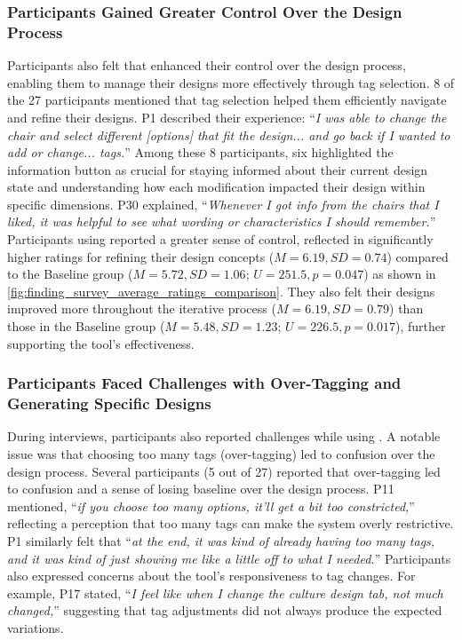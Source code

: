 \subsubsection{\toolname{} Participants Gained Greater Control Over the Design Process}
Participants also felt that \toolname{} enhanced their control over the design process, enabling them to manage their designs more effectively through tag selection. 8 of the 27 participants mentioned that tag selection helped them efficiently navigate and refine their designs. P1 described their experience: ``\textit{I was able to change the chair and select different [options] that fit the design... and go back if I wanted to add or change... tags.}'' Among these 8 participants, six highlighted the information button as crucial for staying informed about their current design state and understanding how each modification impacted their design within specific dimensions. P30 explained, ``\textit{Whenever I got info from the chairs that I liked, it was helpful to see what wording or characteristics I should remember.}'' Participants using \toolname{} reported a greater sense of control, reflected in significantly higher ratings for refining their design concepts ($M = 6.19, SD = 0.74$) compared to the Baseline group ($M = 5.72, SD = 1.06$; $U = 251.5, p = 0.047$) as shown in \autoref{fig:finding_survey_average_ratings_comparison}. They also felt their designs improved more throughout the iterative process ($M = 6.19, SD = 0.79$) than those in the Baseline group ($M = 5.48, SD = 1.23$; $U = 226.5, p = 0.017$), further supporting the tool’s effectiveness.


\subsubsection{\toolname{} Participants Faced Challenges with Over-Tagging and Generating Specific Designs}
During interviews, participants also reported challenges while using \toolname{}. A notable issue was that choosing too many tags (over-tagging) led to confusion over the design process. Several participants (5 out of 27) reported that over-tagging led to confusion and a sense of losing baseline over the design process. P11 mentioned, ``\textit{if you choose too many options, it'll get a bit too constricted,}'' reflecting a perception that too many tags can make the system overly restrictive. P1 similarly felt that ``\textit{at the end, it was kind of already having too many tags, and it was kind of just showing me like a little off to what I needed.}'' Participants also expressed concerns about the tool's responsiveness to tag changes. For example, P17 stated, ``\textit{I feel like when I change the culture design tab, not much changed,}'' suggesting that tag adjustments did not always produce the expected variations.

